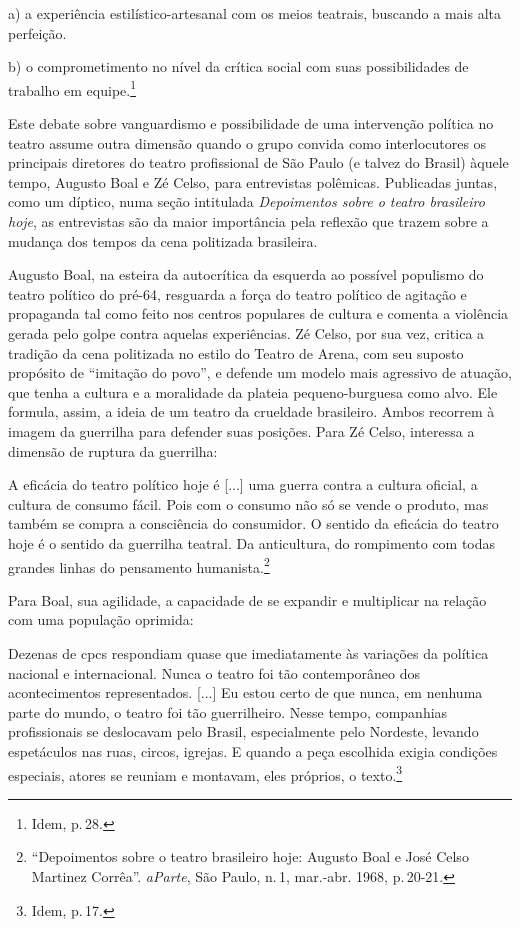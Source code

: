 a) a experiência estilístico-artesanal com os meios teatrais, buscando a
mais alta perfeição.

b) o comprometimento no nível da crítica social com suas possibilidades
de trabalho em equipe.\footnote{Idem, p.\,28.}
\stopblockquote

Este debate sobre vanguardismo e possibilidade de uma intervenção
política no teatro assume outra dimensão quando o grupo convida como
interlocutores os principais diretores do teatro profissional de São
Paulo (e talvez do Brasil) àquele tempo, Augusto Boal e Zé Celso, para
entrevistas polêmicas. Publicadas juntas, como um díptico, numa seção
intitulada {\it Depoimentos sobre o teatro brasileiro hoje}, as
entrevistas são da maior importância pela reflexão que trazem sobre a
mudança dos tempos da cena politizada brasileira.

Augusto Boal, na esteira da autocrítica da esquerda ao possível
populismo do teatro político do pré-64, resguarda a força do teatro
político de agitação e propaganda tal como feito nos centros populares
de cultura e comenta a violência gerada pelo golpe contra aquelas
experiências. Zé Celso, por sua vez, critica a tradição da cena
politizada no estilo do Teatro de Arena, com seu suposto propósito de
“imitação do povo”, e defende um modelo mais agressivo de atuação, que
tenha a cultura e a moralidade da plateia pequeno-burguesa como alvo.
Ele formula, assim, a ideia de um teatro da crueldade brasileiro. Ambos
recorrem à imagem da guerrilha para defender suas posições. Para Zé
Celso, interessa a dimensão de ruptura da guerrilha:

\startblockquote
A eficácia do teatro político hoje é {[}...{]} uma guerra contra a
cultura oficial, a cultura de consumo fácil. Pois com o consumo não só
se vende o produto, mas também se compra a consciência do consumidor. O
sentido da eficácia do teatro hoje é o sentido da guerrilha teatral. Da
anticultura, do rompimento com todas grandes linhas do pensamento
humanista.\footnote{“Depoimentos sobre o teatro brasileiro hoje: Augusto
  Boal e José Celso Martinez Corrêa”. {\it aParte}, São Paulo, n.\,1,
  mar.-abr. 1968, p.\,20-21.}
\stopblockquote

Para Boal, sua agilidade, a capacidade de se expandir e multiplicar na
relação com uma população oprimida:

\startblockquote
Dezenas de {\sc cpc}s respondiam quase que imediatamente às variações da
política nacional e internacional. Nunca o teatro foi tão contemporâneo
dos acontecimentos representados. {[}...{]} Eu estou certo de que nunca,
em nenhuma parte do mundo, o teatro foi tão guerrilheiro. Nesse tempo,
companhias profissionais se deslocavam pelo Brasil, especialmente pelo
Nordeste, levando espetáculos nas ruas, circos, igrejas. E quando a peça
escolhida exigia condições especiais, atores se reuniam e montavam, eles
próprios, o texto.\footnote{Idem, p.\,17.}
\stopblockquote

